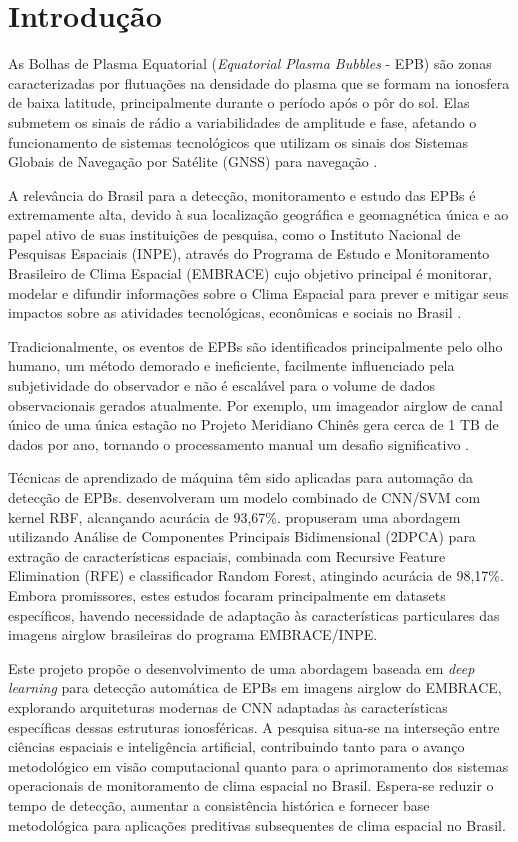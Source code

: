 \chapter{Introdução}

As Bolhas de Plasma Equatorial (\textit{Equatorial Plasma Bubbles} - EPB) são zonas caracterizadas por flutuações na densidade do plasma que se formam na ionosfera de baixa latitude, principalmente durante o período após o pôr do sol. Elas submetem os sinais de rádio a variabilidades de amplitude e fase, afetando o funcionamento de sistemas tecnológicos que utilizam os sinais dos Sistemas Globais de Navegação por Satélite (GNSS) para navegação \cite{Githio2024}.

A relevância do Brasil para a detecção, monitoramento e estudo das EPBs é extremamente alta, devido à sua localização geográfica e geomagnética única e ao papel ativo de suas instituições de pesquisa, como o Instituto Nacional de Pesquisas Espaciais (INPE), através do Programa de Estudo e Monitoramento Brasileiro de Clima Espacial (EMBRACE) cujo objetivo principal é monitorar, modelar e difundir informações sobre o Clima Espacial para prever e mitigar seus impactos sobre as atividades tecnológicas, econômicas e sociais no Brasil \cite{EMBRACE2021}.

Tradicionalmente, os eventos de EPBs são identificados principalmente pelo olho humano, um método demorado e ineficiente, facilmente influenciado pela subjetividade do observador e não é escalável para o volume de dados observacionais gerados atualmente. Por exemplo, um imageador airglow de canal único de uma única estação no Projeto Meridiano Chinês gera cerca de 1 TB de dados por ano, tornando o processamento manual um desafio significativo \cite{Zhong2025}.

Técnicas de aprendizado de máquina têm sido aplicadas para automação da detecção de EPBs.  desenvolveram um modelo combinado de CNN/SVM com kernel RBF, alcançando acurácia de 93,67\%.  propuseram uma abordagem utilizando Análise de Componentes Principais Bidimensional (2DPCA) para extração de características espaciais, combinada com Recursive Feature Elimination (RFE) e classificador Random Forest, atingindo acurácia de 98,17\%. Embora promissores, estes estudos focaram principalmente em datasets específicos, havendo necessidade de adaptação às características particulares das imagens airglow brasileiras do programa EMBRACE/INPE.


Este projeto propõe o desenvolvimento de uma abordagem baseada em \textit{deep learning} para detecção automática de EPBs em imagens airglow do EMBRACE, explorando arquiteturas modernas de CNN adaptadas às características específicas dessas estruturas ionosféricas. A pesquisa situa-se na interseção entre ciências espaciais e inteligência artificial, contribuindo tanto para o avanço metodológico em visão computacional quanto para o aprimoramento dos sistemas operacionais de monitoramento de clima espacial no Brasil. Espera-se reduzir o tempo de detecção, aumentar a consistência histórica e fornecer base metodológica para aplicações preditivas subsequentes de clima espacial no Brasil.
